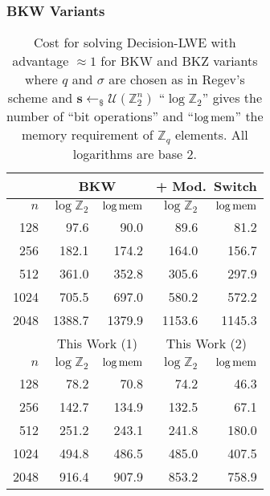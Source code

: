 \documentclass[10pt]{beamer}
\newcommand{\U}[1]{\ensuremath{\mathcal{U}(#1)\xspace}}
\renewcommand{\vec}[1]{\mathbf{#1}\xspace}
\newcommand{\Z}{\ensuremath{\mathbb{Z}}\xspace}
\newcommand{\Zq}{\ensuremath{\Z_q}\xspace}
\newcommand{\sample}{\ensuremath{\leftarrow_{\$}}}
\begin{document}
\begin{frame}[allowframebreaks]
\frametitle{BKW Variants}

\begin{table}[htbp]
\footnotesize
\centering
\begin{tabular}{|r||r|r||r|r|}
\hline
    & \multicolumn{2}{|c||}{BKW} & \multicolumn{2}{|c|}{+ Mod.\ Switch}\\
\hline
$n$ & $\log \Z_2$ & $\log \textnormal{mem}$ &$\log \Z_2$ & $\log \textnormal{mem}$\\
\hline
 128 &   97.6 &   90.0  &   89.6 &   81.2\\
 256 &  182.1 &  174.2  &  164.0 &  156.7\\
 512 &  361.0 &  352.8  &  305.6 &  297.9\\
1024 &  705.5 &  697.0  &  580.2 &  572.2\\
2048 & 1388.7 & 1379.9  & 1153.6 & 1145.3\\

\hline
    & \multicolumn{2}{|c||}{This Work (1)} & \multicolumn{2}{|c|}{This Work (2)}\\
\hline
$n$ & $\log \Z_2$ & $\log \textnormal{mem}$ &$\log \Z_2$ & $\log \textnormal{mem}$\\
\hline
 128 &  78.2 &  70.8 &  74.2 &  46.3\\
 256 & 142.7 & 134.9 & 132.5 &  67.1\\
 512 & 251.2 & 243.1 & 241.8 & 180.0\\
1024 & 494.8 & 486.5 & 485.0 & 407.5\\
2048 & 916.4 & 907.9 & 853.2 & 758.9\\
\hline
\end{tabular}
\caption{Cost for solving Decision-LWE with advantage $\approx 1$ for BKW and BKZ variants where $q$ and $\sigma$ are chosen as in Regev's scheme and $\vec{s} \sample \U{\Z_2^n}$ ``$\log \Z_2$'' gives the number of ``bit operations'' and ``$\log \textnormal{mem}$'' the memory requirement of $\Zq$ elements. All logarithms are base 2.}
\label{tab:modred}
\end{table}

\framebreak

\end{frame}
\end{document}

